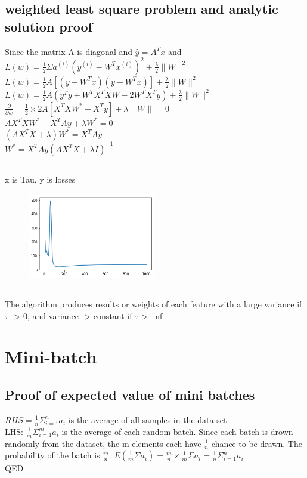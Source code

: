 \documentclass[letterpaper]{article}
\begin{document}
\subsection{weighted least square problem and analytic solution proof}
Since the matrix A is diagonal and $\hat{y} =A^T x$ and $L(w) = \frac{1}{2} \Sigma a^{(i)}(y^{(i)} - W^T x^{(i)} )^{2} + \frac{\lambda}{2} \lVert W \rVert ^{2}$ \\
$ L(w) = \frac{1}{2} A [(y - W^T x)(y - W^T x)] + \frac{\lambda}{2} \lVert W \rVert ^{2}$\\
$ L(w) = \frac{1}{2} A (y^T y + W^T X^T XW -2W^T  X^T y) +\frac{\lambda}{2}  \lVert W \rVert ^{2}$\\
$ \frac{\partial}{\partial{w}} =\frac{1}{2} \times 2 A[X^T X W^{*} - X^T y] + \lambda \lVert W \rVert = 0$\\
$A X^T X W^{*} - X^T Ay + \lambda W^{*} = 0 $\\
$(A X^T X + \lambda)W^{*} = X^T Ay  $\\
$W^{*} = X^T Ay (A X^T X + \lambda I)^{-1} $


\subsection{}
x is Tau, y is losses
\begin{figure}[H]
\centering
\includegraphics[width=0.5\textwidth]{q2_final.png}
\caption{\label{fig:q2}}
\end{figure}

\subsection{}
The algorithm produces results or weights of each feature with a large variance if $\tau$ -> 0,  and
 variance -> constant if $\tau $-> $\inf$
 
\section{Mini-batch}
\subsection{Proof of expected value of mini batches}
$RHS = \frac{1}{n} \Sigma_{i=1}^{n}a_{i}$ is the average of all samples in the data set\\
LHS: $ \frac{1}{m}  \Sigma_{i=1}^{m} a_{i} $ is the average of each random batch. Since each batch is drown randomly from the dataset, the m elements each have $ \frac{1}{n}$ chance to be drawn. The probability of the batch is $ \frac{m}{n}$. $E(\frac{1}{m} \Sigma  a_{i}) = \frac{m}{n} \times  \frac{1}{m} \Sigma  a_{i} = \frac{1}{n} \Sigma_{i=1}^{n} a_{i} $ \\
QED
\end{document}
